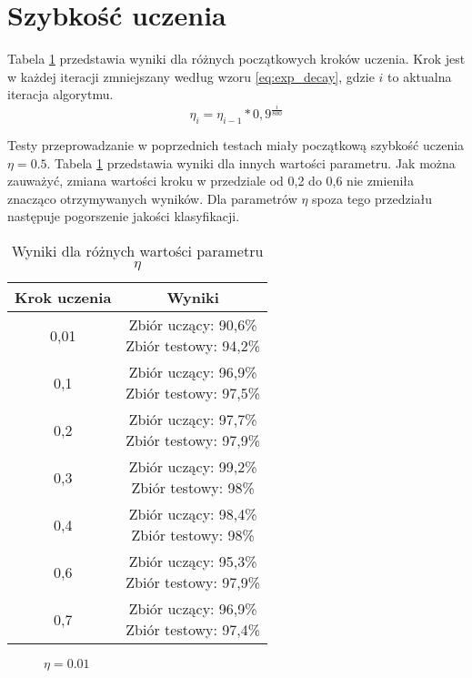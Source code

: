 \section{Szybkość uczenia}
Tabela \ref{table:kroki} przedstawia wyniki dla różnych początkowych kroków uczenia. Krok jest w każdej iteracji zmniejszany według wzoru \ref{eq:exp_decay}, gdzie $i$ to aktualna iteracja algorytmu. 
\begin{equation}
\eta_i = \eta_{i-1} * 0,9^{\frac{i}{800}}
\label{eq:exp_decay}
\end{equation}

Testy przeprowadzanie w poprzednich testach miały początkową szybkość uczenia $\eta=\num{0,5}$. Tabela \ref{table:kroki} przedstawia wyniki dla innych wartości parametru. Jak można zauważyć, zmiana wartości kroku w przedziale od 0,2 do 0,6 nie zmieniła znacząco otrzymywanych wyników. Dla parametrów $\eta$ spoza tego przedziału następuje pogorszenie jakości klasyfikacji.
\begin{table}
\centering
\begin{tabular}{|c|c|}
\hline
Krok uczenia & Wyniki \\ \hline
0,01 & \makecell{Zbiór uczący: 90,6\% \\ Zbiór testowy: 94,2\%} \\ \hline
0,1 & \makecell{Zbiór uczący: 96,9\% \\ Zbiór testowy: 97,5\%} \\ \hline
0,2 & \makecell{Zbiór uczący: 97,7\% \\ Zbiór testowy: 97,9\%} \\ \hline
0,3 & \makecell{Zbiór uczący: 99,2\% \\ Zbiór testowy: 98\%} \\ \hline
0,4 & \makecell{Zbiór uczący: 98,4\% \\ Zbiór testowy: 98\%} \\ \hline
0,6 & \makecell{Zbiór uczący: 95,3\% \\ Zbiór testowy: 97,9\%} \\ \hline
0,7 & \makecell{Zbiór uczący: 96,9\% \\ Zbiór testowy: 97,4\%} \\ \hline

\end{tabular}
\caption{Wyniki dla różnych wartości parametru $\eta$}
\label{table:kroki}
\end{table}

\begin{figure}
\centering
{}
\caption{$\eta = \num{0,01}$}
\label{fig:krok_01}
\end{figure}

